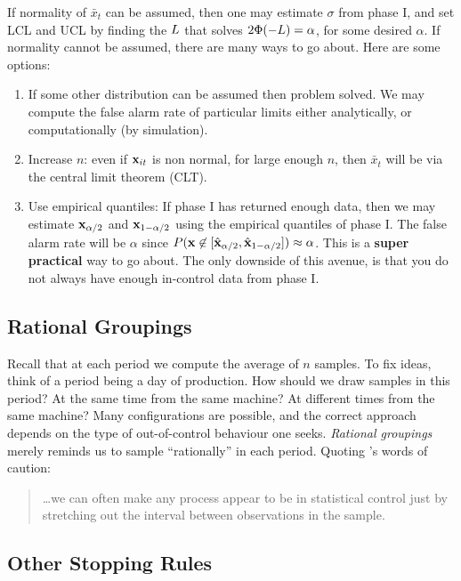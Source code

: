 If normality of $\bar{x}_t$ can be assumed, then one may estimate $\sigma$ from phase I, and set LCL and UCL by finding the $L$ that solves $2\Phi(-L)=\alpha$, for some desired $\alpha$. 
If normality cannot be assumed, there are many ways to go about. Here are some options:
\begin{enumerate}
\item If some other distribution can be assumed then problem solved.
We may compute the false alarm rate of particular limits either analytically, or computationally (by simulation).
\item Increase $n$: even if $\mathbf{x}_{it}$ is non normal, for large enough $n$, then $\bar{x}_t$ will be via the central limit theorem (CLT).
\item Use empirical quantiles: If phase I has returned enough data, then we may estimate 
$\mathbf{x}_{\alpha/2}$ and $\mathbf{x}_{1-\alpha/2}$ using the empirical quantiles of phase I. 
The false alarm rate will be $\alpha$ since $P(\mathbf{x} \not \in [\hat{\mathbf{x}}_{\alpha/2},\hat{\mathbf{x}}_{1-\alpha/2}]) \approx \alpha$.
This is a \textbf{super practical} way to go about. The only downside of this avenue, is that you do not always have enough in-control data from phase I.
\end{enumerate}




\subsection{Rational Groupings}
\label{sec:rational_grouping}
Recall that at each period we compute the average of $n$ samples. 
To fix ideas, think of a period being a day of production. 
How should we draw samples in this period? 
At the same time from the same machine?
At different times from the same machine?
Many configurations are possible, and the correct approach depends on the type of out-of-control behaviour one seeks. 
\emph{Rational groupings} merely reminds us to sample ``rationally'' in each period. 
Quoting \cite{montgomery_introduction_2007}'s words of caution:
\begin{quotation}
\dots we can often make any process appear to be in statistical control just by stretching out the interval between observations in the sample.
\end{quotation}






\subsection{Other Stopping Rules}
\label{sec:stopping_rules}

